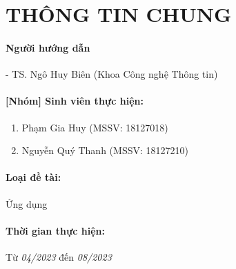 \newpage

\section{THÔNG TIN CHUNG}

\paragraph{Người hướng dẫn}
\tab - TS. Ngô Huy Biên (Khoa Công nghệ Thông tin)    

\paragraph{[Nhóm] Sinh viên thực hiện:}
\begin{enumerate}
    \item Phạm Gia Huy (MSSV: 18127018)
    \item Nguyễn Quý Thanh (MSSV: 18127210)
\end{enumerate}

\paragraph{Loại đề tài:}
Ứng dụng

\paragraph{Thời gian thực hiện:}
Từ \textsl{04/2023} đến \textsl{08/2023}
